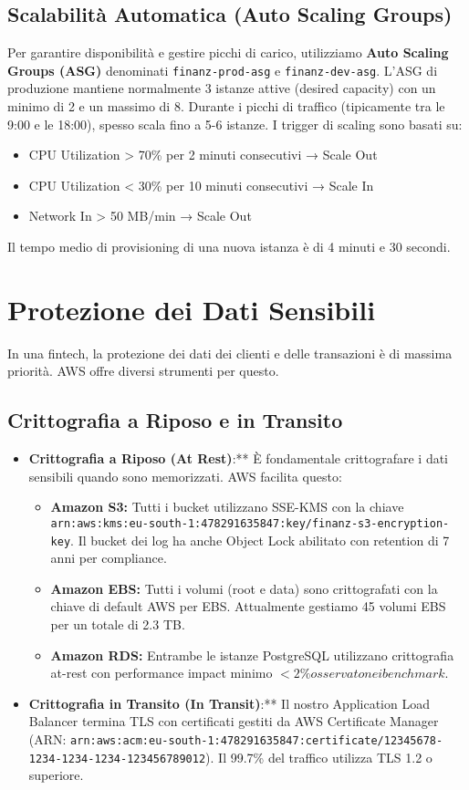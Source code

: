 \subsection{Scalabilità Automatica (Auto Scaling Groups)}
\label{subsec:auto-scaling}
Per garantire disponibilità e gestire picchi di carico, utilizziamo \textbf{Auto Scaling Groups (ASG)} denominati \texttt{finanz-prod-asg} e \texttt{finanz-dev-asg}. L'ASG di produzione mantiene normalmente 3 istanze attive (desired capacity) con un minimo di 2 e un massimo di 8. Durante i picchi di traffico (tipicamente tra le 9:00 e le 18:00), spesso scala fino a 5-6 istanze. I trigger di scaling sono basati su:
\begin{itemize}
    \item CPU Utilization > 70\% per 2 minuti consecutivi → Scale Out
    \item CPU Utilization < 30\% per 10 minuti consecutivi → Scale In
    \item Network In > 50 MB/min → Scale Out
\end{itemize}
Il tempo medio di provisioning di una nuova istanza è di 4 minuti e 30 secondi.

\section{Protezione dei Dati Sensibili}
\label{sec:data-protection}
In una fintech, la protezione dei dati dei clienti e delle transazioni è di massima priorità. AWS offre diversi strumenti per questo.

\subsection{Crittografia a Riposo e in Transito}
\label{subsec:encryption}
\begin{itemize}
    \item \textbf{Crittografia a Riposo (At Rest)}:** È fondamentale crittografare i dati sensibili quando sono memorizzati. AWS facilita questo:
        \begin{itemize}
            \item \textbf{Amazon S3:} Tutti i bucket utilizzano SSE-KMS con la chiave \texttt{arn:aws:kms:eu-south-1:478291635847:key/finanz-s3-encryption-key}. Il bucket dei log ha anche Object Lock abilitato con retention di 7 anni per compliance.
            \item \textbf{Amazon EBS:} Tutti i volumi (root e data) sono crittografati con la chiave di default AWS per EBS. Attualmente gestiamo 45 volumi EBS per un totale di 2.3 TB.
            \item \textbf{Amazon RDS:} Entrambe le istanze PostgreSQL utilizzano crittografia at-rest con performance impact minimo \(< 2\% osservato nei benchmark\).
        \end{itemize}
    \item \textbf{Crittografia in Transito (In Transit)}:** Il nostro Application Load Balancer termina TLS con certificati gestiti da AWS Certificate Manager (ARN: \texttt{arn:aws:acm:eu-south-1:478291635847:certificate/12345678-1234-1234-1234-123456789012}). Il 99.7\% del traffico utilizza TLS 1.2 o superiore.
\end{itemize}

